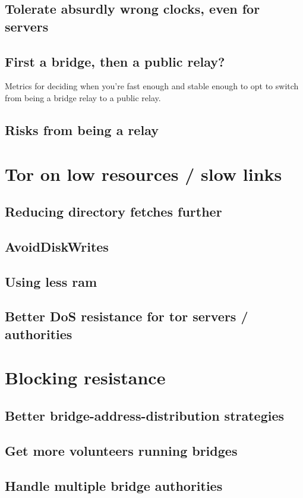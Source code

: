 \documentclass{article}
\begin{document}
\subsection{Tolerate absurdly wrong clocks, even for servers}
\subsection{First a bridge, then a public relay?}
Metrics for deciding when you're fast enough and stable enough
      to opt to switch from being a bridge relay to a public relay.
\subsection{Risks from being a relay}
\section{Tor on low resources / slow links}
\subsection{Reducing directory fetches further}
\label{subsec:fewer-descriptor-fetches}
\subsection{AvoidDiskWrites}
\subsection{Using less ram}
\subsection{Better DoS resistance for tor servers / authorities}
\section{Blocking resistance}
\subsection{Better bridge-address-distribution strategies}
\subsection{Get more volunteers running bridges}
\subsection{Handle multiple bridge authorities}
\end{document}
